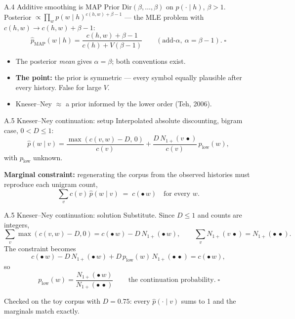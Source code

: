 \documentclass[11pt,aspectratio=169]{beamer}
\newcommand{\dest}[1]{\textcolor{structure}{\textbf{#1}}}
\begin{document}
\begin{frame}{A.4 Additive smoothing is MAP}
  Prior $\mathrm{Dir}(\beta,\dots,\beta)$ on $p(\cdot\mid h)$, $\beta>1$.
  Posterior $\propto\prod_w p(w\mid h)^{c(h,w)+\beta-1}$ --- the MLE problem with
  $c(h,w)\to c(h,w)+\beta-1$:
  \[
    \hat p_{\text{MAP}}(w\mid h) = \frac{c(h,w) + \beta - 1}{c(h) + V(\beta - 1)}
    \qquad(\text{add-}\alpha,\ \alpha = \beta-1).\;\square
  \]

  \vspace{0.8em}
  \begin{itemize}
    \item The posterior \emph{mean} gives $\alpha = \beta$; both conventions exist.
    \item \dest{The point:} the prior is symmetric --- every symbol equally plausible after
          every history. False for large $V$.
    \item Kneser--Ney $\approx$ a prior informed by the lower order (Teh, 2006).
  \end{itemize}
\end{frame}

\begin{frame}{A.5 Kneser--Ney continuation: setup}
  Interpolated absolute discounting, bigram case, $0<D\le 1$:
  \[
    \hat p(w\mid v) = \frac{\max(c(v,w)-D,\,0)}{c(v)} + \frac{D\,N_{1+}(v\,\bullet)}{c(v)}\,p_{\text{low}}(w),
  \]
  with $p_{\text{low}}$ unknown.

  \vspace{1em}
  \textbf{Marginal constraint:} regenerating the corpus from the observed histories must
  reproduce each unigram count,
  \[
    \sum_v c(v)\,\hat p(w\mid v) \;=\; c(\bullet\,w) \quad\text{for every } w .
  \]
\end{frame}

\begin{frame}{A.5 Kneser--Ney continuation: solution}
  Substitute. Since $D\le 1$ and counts are integers,
  \[
    \sum_v\max(c(v,w)-D,0) = c(\bullet\,w) - D\,N_{1+}(\bullet\,w),
    \qquad
    \sum_v N_{1+}(v\,\bullet) = N_{1+}(\bullet\,\bullet).
  \]
  The constraint becomes
  \[
    c(\bullet\,w) - D\,N_{1+}(\bullet\,w) + D\,p_{\text{low}}(w)\,N_{1+}(\bullet\,\bullet) = c(\bullet\,w),
  \]
  so
  \[
    \boxed{\,p_{\text{low}}(w) = \frac{N_{1+}(\bullet\,w)}{N_{1+}(\bullet\,\bullet)}\,}
    \qquad\text{the continuation probability.}\;\square
  \]

  \vspace{0.4em}
  Checked on the toy corpus with $D = 0.75$: every $\hat p(\cdot\mid v)$ sums to 1 and the
  marginals match exactly.
\end{frame}
\end{document}
